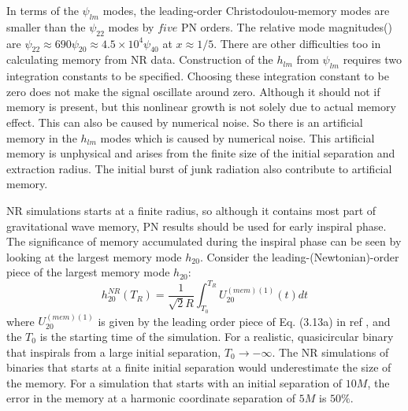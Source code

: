 \documentclass[twocolumn,showpacs,aps,prd,nobibnotes,floatfix]{revtex4-1}
\begin{document}
In terms of the $\psi_{lm}$ modes, the leading-order Christodoulou-memory modes are smaller than the $\psi_{22}$ modes by $five$ PN orders. The relative mode magnitudes(\cite{Favata2009}) are $\psi_{22} \approx 690 \psi_{20}\approx 4.5 \times 10^4 \psi_{40}$ at $x\approx1/5$. There are other difficulties too in calculating memory from NR data. Construction of the $h_{lm}$ from $\psi_{lm}$ requires two integration constants to be specified. Choosing these integration constant to be zero \cite{Reisswig_Pollney2011}  does not make the signal oscillate around zero. Although it should not if memory is present, but this nonlinear growth is not solely due to actual memory effect. This can also be caused by numerical noise. So there is an artificial memory in the $h_{lm}$ modes which is caused by numerical noise. This artificial memory is unphysical and arises from the finite size of the initial separation and extraction radius. The initial burst of junk radiation also contribute to artificial memory.
\par NR simulations starts at a finite radius, so although it contains most part of gravitational wave memory, PN results should be used for early inspiral phase. The significance of memory accumulated during the inspiral phase can be seen by looking at the largest memory mode $h_{20}$. Consider the leading-(Newtonian)-order piece of the largest memory mode $h_{20}$:
\begin{equation}
	h^{NR}_{20}\left(T_R\right) = \frac{1}{\sqrt{2}R}\int_{T_0}^{T_R}U^{(mem)(1)}_{20}(t)dt
\end{equation}
where $U^{(mem)(1)}_{20}$ is given by the leading order piece of Eq. (3.13a) in ref \cite{Favata2009}, and the $T_0$ is the starting time of the simulation. For a realistic, quasicircular binary that inspirals from a large initial separation, $T_0 \rightarrow -\infty$. The NR simulations of binaries that starts at a finite initial separation would underestimate the size of the memory. For a simulation that starts with an initial separation of $10M$, the error in the memory at a harmonic coordinate separation of $5M$ is $50\%$.\cite{Favata2009} 
\end{document}
